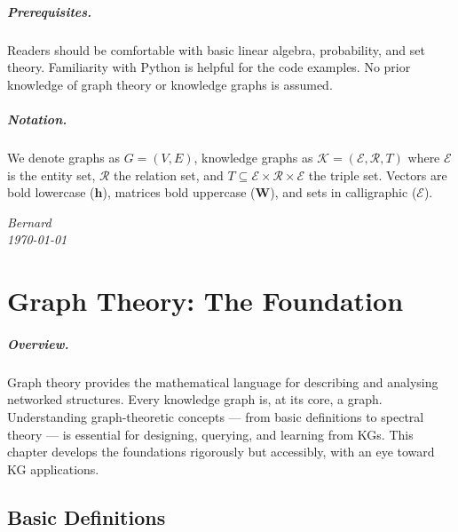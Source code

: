 \documentclass[11pt,a4paper,oneside,openany]{book}
\theoremstyle{definition}
\theoremstyle{plain}
\theoremstyle{remark}
\newcommand{\cE}{\mathcal{E}}
\newcommand{\cR}{\mathcal{R}}
\newcommand{\kg}{\mathcal{K}}
\begin{document}
\paragraph*{Prerequisites.}
Readers should be comfortable with basic linear algebra, probability, and set theory. Familiarity with Python is helpful for the code examples. No prior knowledge of graph theory or knowledge graphs is assumed.

\paragraph*{Notation.}
We denote graphs as $G = (V, E)$, knowledge graphs as $\kg = (\cE, \cR, T)$ where $\cE$ is the entity set, $\cR$ the relation set, and $T \subseteq \cE \times \cR \times \cE$ the triple set. Vectors are bold lowercase ($\mathbf{h}$), matrices bold uppercase ($\mathbf{W}$), and sets in calligraphic ($\cE$).

\vspace{20pt}
\noindent\textit{Bernard}\\
\textit{\today}

\mainmatter

\chapter{Graph Theory: The Foundation}\label{ch:graph-theory}

\paragraph{Overview.}
Graph theory provides the mathematical language for describing and analysing networked structures. Every knowledge graph is, at its core, a graph. Understanding graph-theoretic concepts --- from basic definitions to spectral theory --- is essential for designing, querying, and learning from KGs. This chapter develops the foundations rigorously but accessibly, with an eye toward KG applications.

\section{Basic Definitions}\label{sec:basic-defs}
\end{document}
